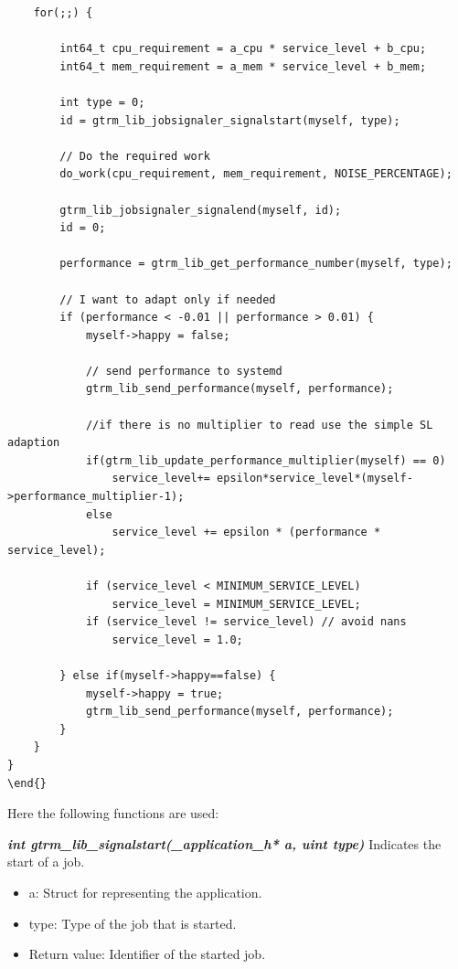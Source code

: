 \documentclass[nobiblatex]{LTHthesis}
\begin{document}
\begin{verbatim}
	for(;;) {		
		
		int64_t cpu_requirement = a_cpu * service_level + b_cpu;
		int64_t mem_requirement = a_mem * service_level + b_mem;

		int type = 0;
		id = gtrm_lib_jobsignaler_signalstart(myself, type);
		
		// Do the required work	
		do_work(cpu_requirement, mem_requirement, NOISE_PERCENTAGE);
		
		gtrm_lib_jobsignaler_signalend(myself, id);
		id = 0;
											
		performance = gtrm_lib_get_performance_number(myself, type);
		
		// I want to adapt only if needed
		if (performance < -0.01 || performance > 0.01) {
			myself->happy = false;
						
			// send performance to systemd
			gtrm_lib_send_performance(myself, performance);				
			
			//if there is no multiplier to read use the simple SL adaption
			if(gtrm_lib_update_performance_multiplier(myself) == 0)
				service_level+= epsilon*service_level*(myself->performance_multiplier-1);
			else
				service_level += epsilon * (performance * service_level);	
													
			if (service_level < MINIMUM_SERVICE_LEVEL)
				service_level = MINIMUM_SERVICE_LEVEL;
			if (service_level != service_level) // avoid nans
				service_level = 1.0;

		} else if(myself->happy==false) {			
			myself->happy = true;
			gtrm_lib_send_performance(myself, performance);
		}	
	}	
}
\end{}
\end{verbatim}
Here the following functions are used:

\begin{framed}
	\begin{flushleft}		
		\emph{\textbf{{int gtrm\_lib\_signalstart(\_application\_h* a, uint type)}}}
				Indicates the start of a job.
				\begin{itemize}
				\item a: Struct for representing the application.
				\item type: Type of the job that is started.
				\item Return value: Identifier of the started job.
				\end{itemize}
	\end{flushleft}
\end{framed}
\end{document}
